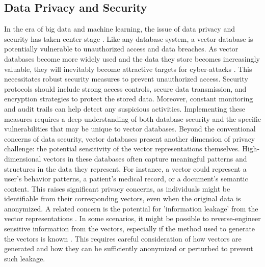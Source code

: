 \documentclass[11pt]{article}
\begin{document}
\subsection{Data Privacy and Security}
In the era of big data and machine learning, the issue of data privacy and security has taken center stage \cite{DBLP:conf/trustcom/GheidC16,DBLP:conf/ccs/WangLWTZ09}. 
%
%
Like any database system, a vector database is potentially vulnerable to unauthorized access and data breaches. As vector databases become more widely used and the data they store becomes increasingly valuable, they will inevitably become attractive targets for cyber-attacks \cite{8355379}. This necessitates robust security measures to prevent unauthorized access.
Security protocols should include strong access controls, secure data transmission, and encryption strategies to protect the stored data. Moreover, constant monitoring and audit trails can help detect any suspicious activities. Implementing these measures requires a deep understanding of both database security and the specific vulnerabilities that may be unique to vector databases.
%
Beyond the conventional concerns of data security, vector databases present another dimension of privacy challenge: the potential sensitivity of the vector representations themselves. High-dimensional vectors in these databases often capture meaningful patterns and structures in the data they represent. For instance, a vector could represent a user's behavior patterns, a patient's medical record, or a document's semantic content. This raises significant privacy concerns, as individuals might be identifiable from their corresponding vectors, even when the original data is anonymized.
A related concern is the potential for 'information leakage' from the vector representations . In some scenarios, it might be possible to reverse-engineer sensitive information from the vectors, especially if the method used to generate the vectors is known \cite{DBLP:journals/corr/abs-2205-10364}. This requires careful consideration of how vectors are generated and how they can be sufficiently anonymized or perturbed to prevent such leakage.
\end{document}
